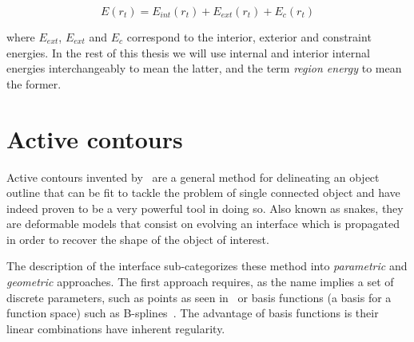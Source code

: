 \begin{equation}
	E(r_t)=E_{int}(r_t)+E_{ext}(r_t)+E_{c}(r_t)
\end{equation}

where $E_{ext}$, $E_{ext}$ and $E_c$ correspond to the interior, exterior and constraint
energies. In the rest of this thesis we will use internal and interior internal energies interchangeably to mean the latter, and the term \textit{region energy} to mean the former.



\section{Active contours}

Active contours invented by~\cite{Kass1988} are a general method for delineating an object outline
that can be fit to tackle the problem of single connected object and have indeed proven to be a very powerful 
tool in doing so. Also known as snakes, they are deformable models that consist on evolving an interface 
which is propagated in order to recover the shape of the object of interest.

The description of the interface sub-categorizes these method into \textit{parametric} and \textit{geometric} approaches. The first approach requires, as the name implies a set of discrete parameters, such as points as seen in~\cite{Kass1988} or basis functions (a basis for a function space) such as B-splines~\cite{Jacob2004,Precioso2005}. The advantage of basis functions is their linear combinations have inherent regularity.

